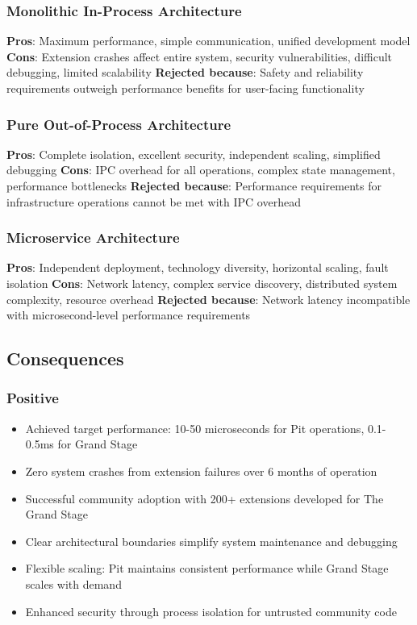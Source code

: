 \subsubsection*{Monolithic In-Process Architecture}
\textbf{Pros}: Maximum performance, simple communication, unified development model
\textbf{Cons}: Extension crashes affect entire system, security vulnerabilities, difficult debugging, limited scalability
\textbf{Rejected because}: Safety and reliability requirements outweigh performance benefits for user-facing functionality

\subsubsection*{Pure Out-of-Process Architecture}
\textbf{Pros}: Complete isolation, excellent security, independent scaling, simplified debugging
\textbf{Cons}: IPC overhead for all operations, complex state management, performance bottlenecks
\textbf{Rejected because}: Performance requirements for infrastructure operations cannot be met with IPC overhead

\subsubsection*{Microservice Architecture}
\textbf{Pros}: Independent deployment, technology diversity, horizontal scaling, fault isolation
\textbf{Cons}: Network latency, complex service discovery, distributed system complexity, resource overhead
\textbf{Rejected because}: Network latency incompatible with microsecond-level performance requirements

\subsection*{Consequences}

\subsubsection*{Positive}
\begin{itemize}
\item Achieved target performance: 10-50 microseconds for Pit operations, 0.1-0.5ms for Grand Stage
\item Zero system crashes from extension failures over 6 months of operation
\item Successful community adoption with 200+ extensions developed for The Grand Stage
\item Clear architectural boundaries simplify system maintenance and debugging
\item Flexible scaling: Pit maintains consistent performance while Grand Stage scales with demand
\item Enhanced security through process isolation for untrusted community code
\end{itemize}

